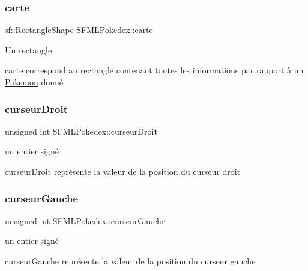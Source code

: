 \subsubsection{\texorpdfstring{carte}{carte}}
{\footnotesize\ttfamily sf\+::\+Rectangle\+Shape S\+F\+M\+L\+Pokedex\+::carte\hspace{0.3cm}{\ttfamily [private]}}



Un rectangle. 

carte correspond au rectangle contenant toutes les informations par rapport à un \hyperlink{class_pokemon}{Pokemon} donné \mbox{\label{class_s_f_m_l_pokedex_a506ab03c641853b9907b0c24184b8a1a}} 
\subsubsection{\texorpdfstring{curseur\+Droit}{curseurDroit}}
{\footnotesize\ttfamily unsigned int S\+F\+M\+L\+Pokedex\+::curseur\+Droit\hspace{0.3cm}{\ttfamily [private]}}



un entier signé 

curseur\+Droit représente la valeur de la position du curseur droit \mbox{\label{class_s_f_m_l_pokedex_a23f07085352a8278d016ce1b40508a0b}} 
\subsubsection{\texorpdfstring{curseur\+Gauche}{curseurGauche}}
{\footnotesize\ttfamily unsigned int S\+F\+M\+L\+Pokedex\+::curseur\+Gauche\hspace{0.3cm}{\ttfamily [private]}}



un entier signé 

curseur\+Gauche représente la valeur de la position du curseur gauche \mbox{\label{class_s_f_m_l_pokedex_ab29c78ecc96b716fa28e59374aba8be4}} 
